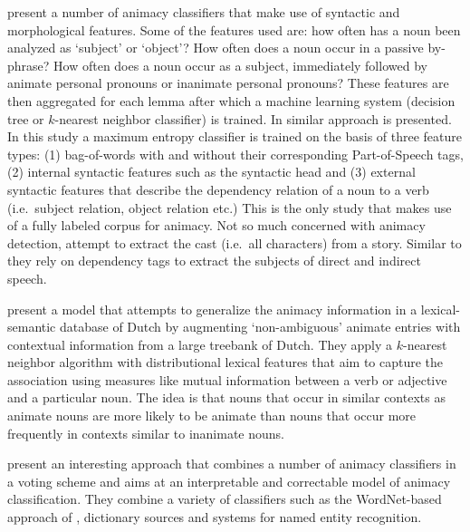 \documentclass[a4paper,UKenglish]{oasics}
\begin{document}
\cite{ovrelid:04,ovrelid:05,ovrelid:06,ovrelid:08,ovrelid:09} present
a number of animacy classifiers that make use of syntactic and
morphological features. Some of the features used are: how often has a
noun been analyzed as `subject' or `object'? How often does a noun
occur in a passive by-phrase? How often does a noun occur as a
subject, immediately followed by animate personal pronouns or
inanimate personal pronouns?  These features are then aggregated for
each lemma after which a machine learning system (decision tree or
$k$-nearest neighbor classifier) is trained. In \cite{bowman:12}
similar approach is presented. In this study a maximum entropy
classifier is trained on the basis of three feature types: (1)
bag-of-words with and without their corresponding Part-of-Speech tags,
(2) internal syntactic features such as the syntactic head and (3)
external syntactic features that describe the dependency relation of a
noun to a verb (i.e.\ subject relation, object relation etc.)  This is
the only study that makes use of a fully labeled corpus for animacy.
Not so much concerned with animacy detection, \cite{karsdorp:12}
attempt to extract the cast (i.e.\ all characters) from a
story. Similar to \cite{bowman:12} they rely on dependency tags to
extract the subjects of direct and indirect speech.

\cite{bloem:13} present a model that attempts to generalize the
animacy information in a lexical-semantic database of Dutch by
augmenting `non-ambiguous' animate entries with contextual information
from a large treebank of Dutch. They apply a $k$-nearest neighbor
algorithm with distributional lexical features that aim to capture the
association using measures like mutual information between a verb or
adjective and a particular noun. The idea is that nouns that occur in
similar contexts as animate nouns are more likely to be animate than
nouns that occur more frequently in contexts similar to inanimate nouns.

\cite{moore:13} present an interesting approach that combines a number
of animacy classifiers in a voting scheme and aims at an interpretable
and correctable model of animacy classification. They combine a
variety of classifiers such as the WordNet-based approach of
\cite{evans:00}, dictionary sources and systems for named entity
recognition.
\end{document}
